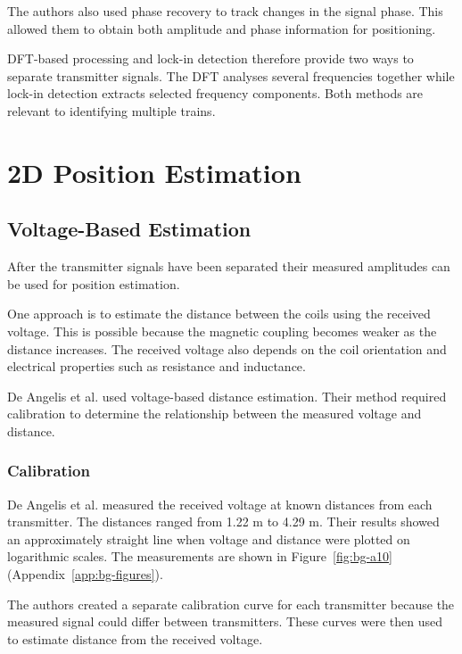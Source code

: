 The authors also used phase recovery to track changes in the signal phase. This allowed them to obtain both amplitude and phase information for 
positioning.

DFT-based processing and lock-in detection therefore provide two ways to separate transmitter signals. The DFT analyses several frequencies together 
while lock-in detection extracts selected frequency components. Both methods are relevant to identifying multiple trains.





\section{2D Position Estimation}\label{sec:bg-1-5}

\subsection{Voltage-Based Estimation}\label{sec:bg-1-5-1}

After the transmitter signals have been separated their measured amplitudes can be used for position estimation.

One approach is to estimate the distance between the coils using the received voltage. This is possible because the magnetic coupling becomes 
weaker as the distance increases. 
The received voltage also depends on the coil orientation and electrical properties such as resistance and inductance.

De Angelis et al. \cite{deangelis2015indoor} used voltage-based distance estimation. Their method required calibration to determine the relationship 
between the measured voltage and distance.





\subsubsection{Calibration} \label{sec:bg-1-5-1-1}

De Angelis et al. \cite{deangelis2015indoor} measured the received voltage at known distances from each transmitter. The distances ranged from
1.22 m to 4.29 m. Their results showed an approximately straight line when voltage and distance were plotted on logarithmic scales. The measurements 
are shown in Figure~\ref{fig:bg-a10} (Appendix~\ref{app:bg-figures}).

The authors created a separate calibration curve for each transmitter because the measured signal could differ between transmitters. These curves
were then used to estimate distance from the received voltage.

